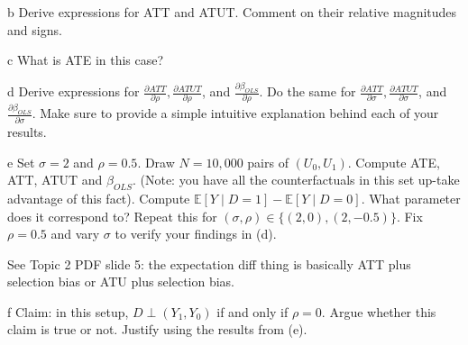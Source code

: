 \documentclass{article}
\begin{document}
\begin{problem}{b}
Derive expressions for ATT and ATUT. Comment on their relative magnitudes and signs.
\end{problem}
\begin{solution}

\end{solution}
\begin{problem}{c}
What is ATE in this case?
\end{problem}
\begin{solution}

\end{solution}
\begin{problem}{d}
Derive expressions for $\frac{\partial A T T}{\partial \rho}, \frac{\partial A T U T}{\partial \rho}$, and $\frac{\partial \beta_{O L S}}{\partial \rho}$. Do the same for $\frac{\partial A T T}{\partial \sigma}, \frac{\partial A T U T}{\partial \sigma}$, and $\frac{\partial \beta_{O L S}}{\partial \sigma}$. Make sure to provide a simple intuitive explanation behind each of your results.
\end{problem}
\begin{solution}

\end{solution}
\begin{problem}{e}
Set $\sigma=2$ and $\rho=0.5$. Draw $N=10,000$ pairs of $\left(U_{0}, U_{1}\right)$. Compute ATE, ATT, ATUT and $\beta_{O L S}$. (Note: you have all the counterfactuals in this set up-take advantage of this fact). Compute $\mathbb{E}[Y \mid D=1]-\mathbb{E}[Y \mid D=0]$. What parameter does it correspond to? Repeat this for $(\sigma, \rho) \in\{(2,0),(2,-0.5)\}$. Fix $\rho=0.5$ and vary $\sigma$ to verify your findings in (d).
\end{problem}
\begin{solution}
    See Topic 2 PDF slide 5: the expectation diff thing is basically ATT plus selection bias or ATU plus selection bias.
\end{solution}
\begin{problem}{f}
Claim: in this setup, $D \perp\left(Y_{1}, Y_{0}\right)$ if and only if $\rho=0$. Argue whether this claim is true or not. Justify using the results from (e).
\end{problem}
\begin{solution}

\end{solution}


\newpage

\end{document}
